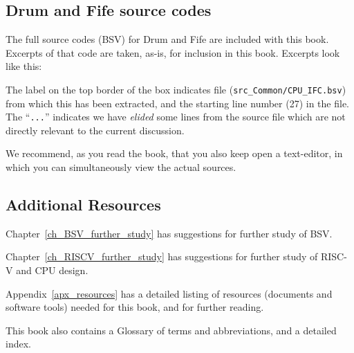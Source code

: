 
\subsection{Drum and Fife source codes}

The full source codes (BSV) for Drum and Fife are included with this
book.  Excerpts of that code are taken, as-is, for inclusion in this
book.  Excerpts look like this:



The label on the top border of the box indicates file
(\verb|src_Common/CPU_IFC.bsv|) from which this has been extracted,
and the starting line number (27) in the file.  The ``\verb|...|''
indicates we have \emph{elided} some lines from the source file which
are not directly relevant to the current discussion.

We recommend, as you read the book, that you also keep open a
text-editor, in which you can simultaneously view the actual sources.


\subsection{Additional Resources}

Chapter~\ref{ch_BSV_further_study} has suggestions for further study
of BSV.

Chapter~\ref{ch_RISCV_further_study} has suggestions for further study
of RISC-V and CPU design.

Appendix~\ref{apx_resources} has a detailed listing of resources
(documents and software tools) needed for this book, and for further
reading.

This book also contains a Glossary of terms and abbreviations, and a
detailed index.

